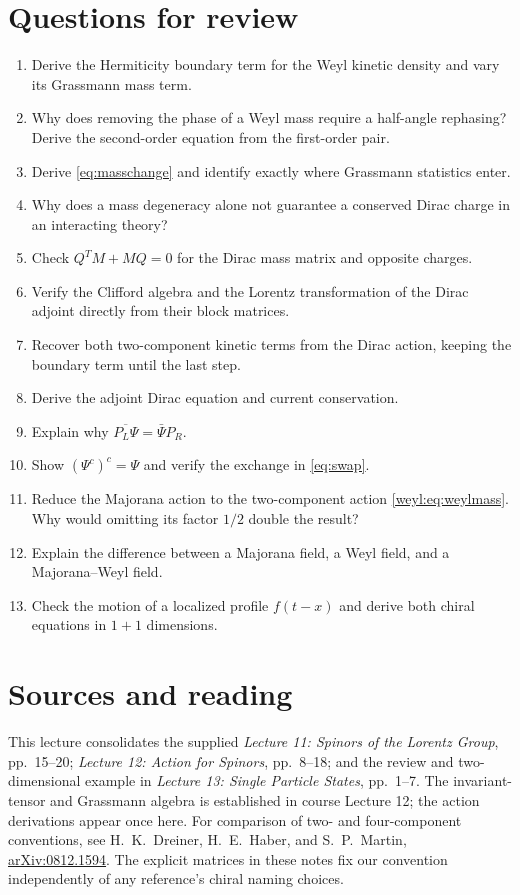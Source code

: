 \documentclass[11pt]{article}
\begin{document}
\section*{Questions for review}
\begin{enumerate}
\item Derive the Hermiticity boundary term for the Weyl kinetic
density and vary its Grassmann mass term.
\item Why does removing the phase of a Weyl mass require a half-angle
rephasing? Derive the second-order equation from the first-order pair.
\item Derive \eqref{eq:masschange} and identify exactly where
Grassmann statistics enter.
\item Why does a mass degeneracy alone not guarantee a conserved
Dirac charge in an interacting theory?
\item Check \(Q^T M+M Q=0\) for the Dirac mass matrix and opposite charges.
\item Verify the Clifford algebra and the Lorentz transformation
of the Dirac adjoint directly from their block matrices.
\item Recover both two-component kinetic terms from the Dirac action,
keeping the boundary term until the last step.
\item Derive the adjoint Dirac equation and current conservation.
\item Explain why \(\overline{P_L\Psi}=\bar\Psi P_R\).
\item Show \((\Psi^c)^c=\Psi\) and verify the exchange in
\eqref{eq:swap}.
\item Reduce the Majorana action to the two-component action
\eqref{weyl:eq:weylmass}.
Why would omitting its factor \(1/2\) double the result?
\item Explain the difference between a Majorana field, a Weyl field,
and a Majorana--Weyl field.
\item Check the motion of a localized profile \(f(t-x)\) and
derive both chiral equations in \(1+1\) dimensions.
\end{enumerate}

\section*{Sources and reading}
This lecture consolidates the supplied \emph{Lecture 11: Spinors of the
Lorentz Group}, pp.\ 15--20; \emph{Lecture 12: Action for Spinors},
pp.\ 8--18; and the review and two-dimensional example in
\emph{Lecture 13: Single Particle States}, pp.\ 1--7.
The invariant-tensor and Grassmann algebra is established in
course Lecture 12; the action derivations appear once here.
For comparison of two- and four-component conventions, see
H.~K.~Dreiner, H.~E.~Haber, and S.~P.~Martin,
\href{https://arxiv.org/abs/0812.1594}{arXiv:0812.1594}.
The explicit matrices in these notes fix our convention independently
of any reference's chiral naming choices.
\end{document}
